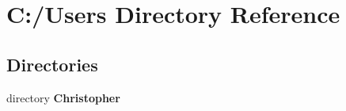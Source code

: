\section{C\+:/\+Users Directory Reference}
\label{dir_8ceffd4ee35c3518d4e8bdc7e638efe8}
\subsection*{Directories}
\begin{DoxyCompactItemize}
\item 
directory {\bf Christopher}
\end{DoxyCompactItemize}
